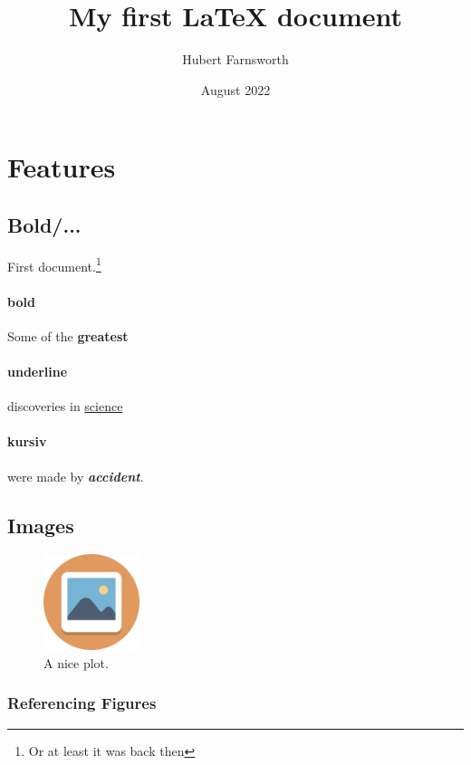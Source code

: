 \documentclass[12pt, letterpaper]{article}
\title{My first LaTeX document}
\author{Hubert Farnsworth}
\date{August 2022}
\begin{document}
\maketitle
\thispagestyle{empty}
\newpage

\tableofcontents
\thispagestyle{empty}
\newpage

\setcounter{page}{1}

\section{Features}

\subsection{Bold/...}

First document.\footnote{Or at least it was back then}
\paragraph{bold}
Some of the \textbf{greatest}
\paragraph{underline}
discoveries in \underline{science} 
\paragraph{kursiv}
were made by \textbf{\textit{accident}}.

\subsection{Images}

\begin{figure}[h]
    \centering
    \includegraphics[width=0.25\textwidth]{image}
    \caption{A nice plot.}
    \label{fig:mesh1}
\end{figure}

\subsubsection{Referencing Figures}
\end{document}
